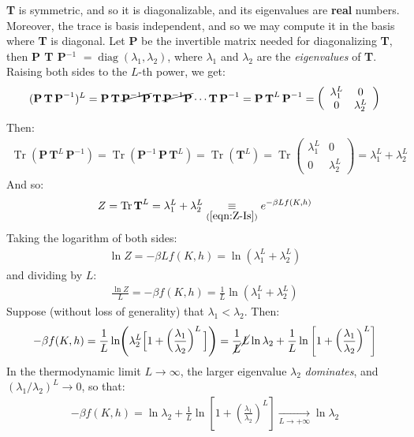 \documentclass[../../main.tex]{subfiles}
\begin{document}
\textbf{T} is symmetric, and so it is diagonalizable, and its eigenvalues are \textbf{real} numbers. Moreover, the trace is basis independent, and so we may compute it in the basis where \textbf{T} is diagonal. Let \textbf{P} be the invertible matrix needed for diagonalizing \textbf{T}, then \textbf{P T P$^{-1}$} $= \operatorname{diag}(\lambda_1, \lambda_2)$, where $\lambda_1$ and $\lambda_2$ are the \textit{eigenvalues} of \textbf{T}. Raising both sides to the $L$-th power, we get:
\begin{align*}
    (\textbf{P}\, \textbf{T}\,\textbf{P}^{-1})^L  = \textbf{P}\,\textbf{T}\,\cancel{\textbf{P}^{-1} \textbf{P}}\,\textbf{T}\,\cancel{\textbf{P}^{-1} \textbf{P}}\cdots \textbf{T}\, \textbf{P}^{-1} = \textbf{P}\,\textbf{T}^L\, \textbf{P}^{-1} = \left(\begin{array}{cc}
    \lambda_1^L & 0 \\ 
    0 & \lambda_2^L
    \end{array}\right)           
\end{align*} 
Then:
\begin{align*}
    \operatorname{Tr}(\textbf{P}\,\textbf{T}^L\,\textbf{P}^{-1}) = \operatorname{Tr}(\textbf{P}^{-1}\,\textbf{P}\,\textbf{T}^L) = \operatorname{Tr}(\textbf{T}^L) =\operatorname{Tr} \left(\begin{array}{cc}
    \lambda_1^L & 0 \\ 
    0 & \lambda_2^L
    \end{array}\right) = \lambda_1^L + \lambda_2^L
\end{align*}
And so:
\begin{align*}
    Z = \operatorname{Tr} \textbf{T}^L = \lambda_1^L + \lambda_2^L  \underset{(\ref{eqn:Z-Is})}{\equiv}  e^{-\beta L f(K,h)}
\end{align*}
Taking the logarithm of both sides:
\begin{align*}
    \ln Z = - \beta L f(K,h) = \ln (\lambda_1^L + \lambda_2^L)
\end{align*}
and dividing by $L$:
\begin{align*}
    \frac{\ln Z}{L} = - \beta f(K,h) = \frac{1}{L} \ln(\lambda_1^L + \lambda_2^L)  
\end{align*}
Suppose (without loss of generality) that $\lambda_1 < \lambda_2$. Then:
\begin{align*}
    -\beta f(K,h) = \frac{1}{L} \ln(\lambda_2^L \Big[1+\left(\frac{\lambda_1}{\lambda_2}\right)^L \Big]) = \frac{1}{\cancel{L}} \cancel{L} \ln \lambda_2 + \frac{1}{L} \ln \left[1+\left(\frac{\lambda_1}{\lambda_2}\right)^L \right]  
\end{align*}
In the thermodynamic limit $L \to \infty$, the larger eigenvalue $\lambda_2$ \textit{dominates}, and $(\lambda_1/\lambda_2)^L \to 0$, so that:
\begin{align}\label{eqn:f-limit}
    -\beta f(K,h) = \ln \lambda_2 + \frac{1}{L} \ln \left[1+\left(\frac{\lambda_1}{\lambda_2}\right)^L \right] \xrightarrow[L \to +\infty]{} \ln \lambda_2
\end{align} 
\end{document}
